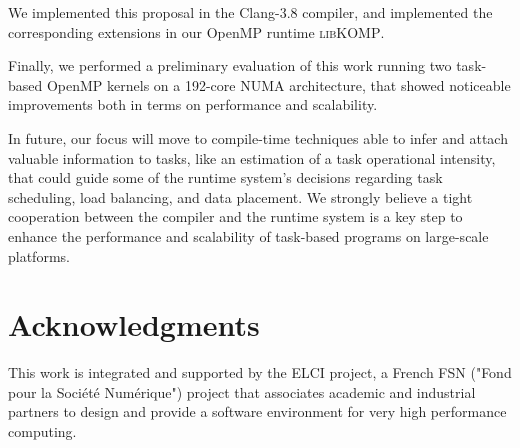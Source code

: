 \documentclass{Styles/llncs}
\newcommand{\libXKOMP}{\textsc{libKOMP}\xspace}
\begin{document}
We implemented this proposal in the Clang-3.8 compiler, and implemented the
corresponding extensions in our OpenMP runtime \libXKOMP.

Finally, we performed a preliminary evaluation of this work running two task-based OpenMP kernels on a 192-core NUMA architecture,
that showed noticeable improvements both in terms on performance and scalability.

In future, our focus will move to compile-time techniques able to infer and
attach valuable information to tasks, like an estimation of a task operational intensity,
that could guide some of the runtime system's decisions regarding task scheduling, load balancing, and data placement.
We strongly believe a tight cooperation between the compiler and the runtime system
is a key step to enhance the performance and scalability of task-based programs on large-scale platforms.


\section*{Acknowledgments}


This work is integrated and supported by the ELCI  project, a French FSN ("Fond pour la Société Numérique")
project that associates academic and industrial partners to design and provide a software environment for very high performance
computing.
  \small 

\end{document}
